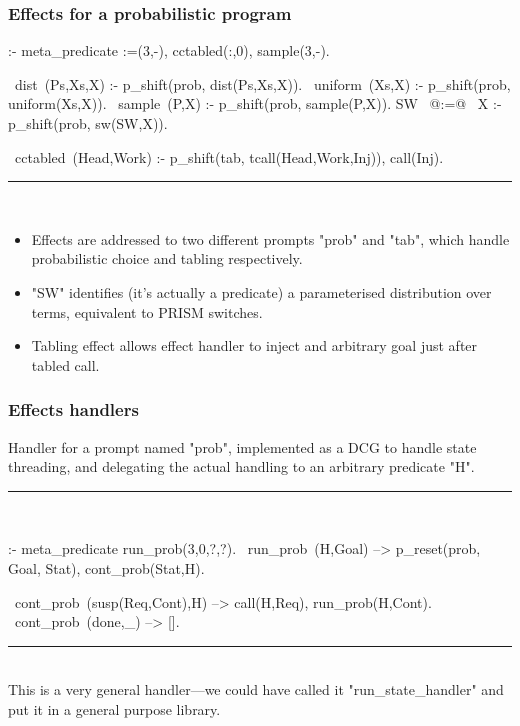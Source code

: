 \documentclass[usenames,dvipsnames]{beamer}
\newenvironment{fframe}[1][untitled]{\begin{frame}[fragile,environment=fframe]\frametitle{{#1}}}{\end{frame}}
\newenvironment{isframe}[1][untitled]{\begin{frame}[fragile=singleslide,environment=isframe]\frametitle{#1}}{\end{frame}}
\begin{document}
\begin{fframe}[Effects for a probabilistic program]
\begin{prolog}[xleftmargin=0em,basicstyle=\small]
  :- meta_predicate :=(3,-), cctabled(:,0), sample(3,-).

  ~dist~(Ps,Xs,X) :- p_shift(prob, dist(Ps,Xs,X)).
  ~uniform~(Xs,X) :- p_shift(prob, uniform(Xs,X)).
  ~sample~(P,X)   :- p_shift(prob, sample(P,X)). 
  SW ~@:=@~ X       :- p_shift(prob, sw(SW,X)).

  ~cctabled~(Head,Work) :- p_shift(tab, tcall(Head,Work,Inj)), call(Inj).
\end{prolog}%
\vspace{-1.5em}
\rule{\linewidth}{0.4pt}\\
\begin{itemize}
  \item<1-> Effects are addressed to two different prompts "prob" and "tab", which handle
probabilistic choice and tabling respectively.

  \item<2-> "SW" identifies (it's actually a predicate) a parameterised distribution over terms, equivalent
to PRISM switches.

  \item<3-> Tabling effect allows effect handler to inject and arbitrary goal just after tabled call.
\end{itemize}

\end{fframe}

\begin{isframe}[Effects handlers]
Handler for a prompt named "prob", implemented as a DCG to handle
state threading, and delegating the actual handling to an arbitrary
predicate "H".

\rule{\linewidth}{0.4pt}\\
\begin{prolog}[xleftmargin=0em,basicstyle=\small]
  :- meta_predicate run_prob(3,0,?,?).
  ~run_prob~(H,Goal) --> {p_reset(prob, Goal, Stat)}, cont_prob(Stat,H).

  ~cont_prob~(susp(Req,Cont),H) --> call(H,Req), run_prob(H,Cont).
  ~cont_prob~(done,_) --> [].
\end{prolog}
\vspace{-1.5em}
\rule{\linewidth}{0.4pt}\\
This is a very general handler---we could have called it "run_state_handler"
and put it in a general purpose library.
\end{isframe}
\end{document}
